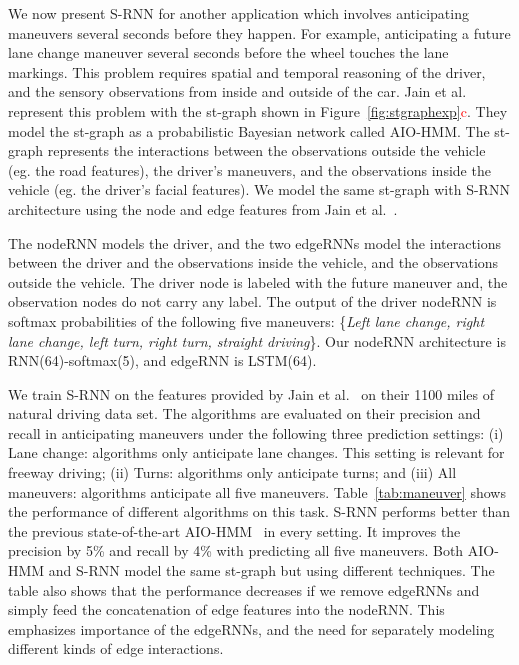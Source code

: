 \documentclass[10pt,twocolumn,letterpaper]{article}
\newcommand{\rc}[1]{\textcolor{red}{#1}}
\begin{document}
We now present S-RNN for another application which involves anticipating maneuvers several seconds before they happen. For example, anticipating a future lane change maneuver several seconds before the wheel touches the lane markings. This problem requires spatial and temporal reasoning of the driver, and the sensory observations from inside and outside of the car. Jain et al.~\cite{Jain15} represent this problem with the st-graph shown in Figure~\ref{fig:stgraphexp}\rc{c}. They model the st-graph as a probabilistic Bayesian network called AIO-HMM. The st-graph represents the interactions between the observations outside the vehicle (eg. the road features), the driver's maneuvers, and the observations inside the vehicle (eg. the driver's facial features). We model the same st-graph with S-RNN architecture using the node and edge features from Jain et al.~\cite{Jain15}.

The nodeRNN models the driver, and the two edgeRNNs model the interactions between the driver and the observations inside the vehicle, and the observations outside the vehicle. The driver node is labeled with the future maneuver and, the observation nodes do not carry any label. The output of the driver nodeRNN is softmax probabilities of the following five maneuvers: \{\textit{Left lane change, right lane change, left turn, right turn, straight driving}\}.  Our nodeRNN architecture is RNN(64)-softmax(5), and edgeRNN is LSTM(64).


We train S-RNN on the features provided by Jain et al.~\cite{Jain15} on their 1100 miles of natural driving data set. The algorithms are evaluated on their precision and recall in anticipating maneuvers  under the following three prediction
settings: (i) Lane change: algorithms only anticipate lane changes. This setting is relevant for freeway driving; (ii) Turns: algorithms only anticipate turns; and (iii) All maneuvers: algorithms anticipate all five maneuvers. Table~\ref{tab:maneuver} shows the performance of different algorithms on this task.  S-RNN performs better than the previous state-of-the-art AIO-HMM~\cite{Jain15} in every setting.  It improves the precision  by 5\% and recall by 4\% with predicting all five maneuvers. Both AIO-HMM and S-RNN model the same st-graph but using different techniques. The table also shows that the performance decreases if we remove edgeRNNs and simply feed the concatenation of edge features into the nodeRNN. This emphasizes importance of the edgeRNNs,  and the need for separately modeling different kinds of edge interactions. 
\fi
\end{document}
